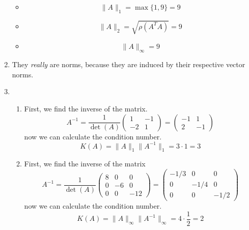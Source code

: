 \documentclass{article}
\newcommand*{\mat}[1]{\begin{pmatrix}#1\end{pmatrix}}
\begin{document}
\begin{enumerate}
{\begin{itemize}
                \item {
                    \begin{displaymath}
                        \|A\|_1 = \max\{1, 9\} = 9
                    \end{displaymath}
                }
                \item {
                    \begin{displaymath}
                        \|A\|_2 = \sqrt{\rho(A^TA)} = 9
                    \end{displaymath}
                }
                \item {
                    \begin{displaymath}
                        \|A\|_\infty = 9
                    \end{displaymath}
                }
            \end{itemize}
        }
        \item {
            They \textit{really} are norms, because they are induced by their respective vector norms. 
        }
        \item {
            \begin{enumerate}
                \item {
                    First, we find the inverse of the matrix.
                    \begin{displaymath}
                        A^{-1} = \frac{1}{\det(A)}\mat{1 & -1 \\ -2 & 1} = \mat{-1 & 1 \\ 2 & -1}
                    \end{displaymath}
                    now we can calculate the condition number.
                    \begin{displaymath}
                        K(A)=\|A\|_1\|A^{-1}\|_1 = 3\cdot1 = 3
                    \end{displaymath}
                }
                \item {
                    First, we find the inverse of the matrix
                    \begin{displaymath}
                        A^{-1} = \frac{1}{\det(A)}\mat{8 & 0 & 0 \\ 0 & -6 & 0 \\ 0 & 0 & -12} = \mat{-1/3 & 0 & 0 \\ 0 & -1/4 & 0 \\ 0 & 0 & -1/2}
                    \end{displaymath}
                    now we can calculate the condition number.
                    \begin{displaymath}
                        K(A)=\|A\|_\infty\|A^{-1}\|_\infty = 4\cdot\frac{1}{2} = 2
                    \end{displaymath}
                }
            \end{enumerate}
        }
    \end{enumerate}
\end{document}
